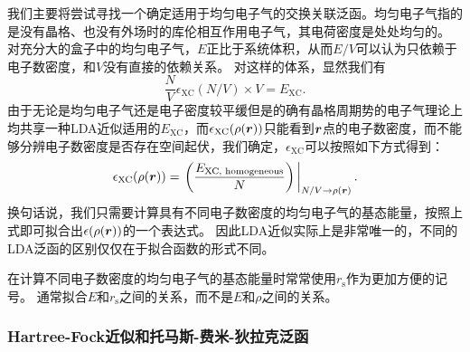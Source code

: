 我们主要将尝试寻找一个确定适用于均匀电子气的交换关联泛函。均匀电子气指的是没有晶格、也没有外场时的库伦相互作用电子气，其电荷密度是处处均匀的。
对充分大的盒子中的均匀电子气，$E$正比于系统体积，从而$E / V$可以认为只依赖于电子数密度，和$V$没有直接的依赖关系。
对这样的体系，显然我们有
\begin{equation}
    \frac{N}{V} \epsilon_\text{XC}(N / V) \times V = E_\text{XC}.
\end{equation}
由于无论是均匀电子气还是电子密度较平缓但是的确有晶格周期势的电子气理论上均共享一种LDA近似适用的$E_\text{XC}$，而$\epsilon_\text{XC}(\rho(\vb*{r}))$只能看到$\vb*{r}$点的电子数密度，而不能够分辨电子数密度是否存在空间起伏，我们确定，$\epsilon_\text{XC}$可以按照如下方式得到：
\begin{equation}
    \epsilon_\text{XC}(\rho(\vb*{r})) = \eval{\left( \frac{E_\text{XC, homogeneous}}{N} \right)}_{N / V \to \rho(\vb*{r})}.
    \label{eq:from-homogeneous-electron-gas}
\end{equation}
换句话说，我们只需要计算具有不同电子数密度的均匀电子气的基态能量，按照上式即可拟合出$\epsilon(\rho(\vb*{r}))$的一个表达式。
因此LDA近似实际上是非常唯一的，不同的LDA泛函的区别仅仅在于拟合函数的形式不同。

在计算不同电子数密度的均匀电子气的基态能量时常常使用$r_\text{s}$作为更加方便的记号。
通常拟合$E$和$r_\text{s}$之间的关系，而不是$E$和$\rho$之间的关系。

\subsubsection{Hartree-Fock近似和托马斯-费米-狄拉克泛函}

